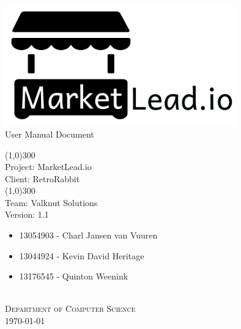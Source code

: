 \documentclass{article}
\begin{document}
	\begin{titlepage}
		\begin{center}
			\includegraphics[width=10cm]{images/marketlead_logo.png}  \\
			[0.5cm]
			\huge{
			User Manual Document\\
			}
			
			\line(1,0){300}\\
			[0.2cm]
			\LARGE{Project: MarketLead.io\\
			Client: RetroRabbit} \\
			\line(1,0){300}\\
			\LARGE{Team: Valknut Solutions}\\
			[1.0cm]
			\large{Version: 1.1}\\
			[1.0cm]
			\large
			{
			\begin{itemize}
				\item 13054903 - Charl Jansen van Vuuren
				\item 13044924 - Kevin David Heritage
				\item 13176545 - Quinton Weenink\\
			\end{itemize}
			}
			\textsc{\large}\\
		[1.0cm]
		\textsc{\large  Department of Computer Science}\\
		[0.5cm]
		\textsc{\large \today}\\
		\end{center}
	\end{titlepage}
	
	\cleardoublepage
	\begin{versionhistory}
	\end{versionhistory}	
	
\end{document}
